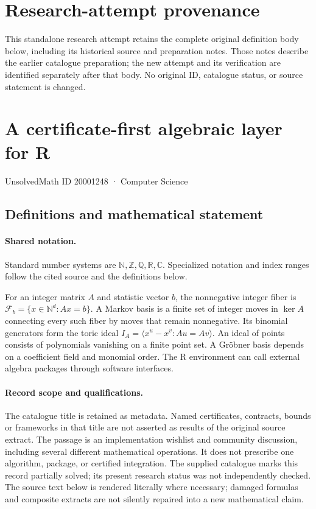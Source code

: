 \documentclass[11pt]{article}
\begin{document}
\section*{Research-attempt provenance}
This standalone research attempt retains the complete original definition body below,
including its historical source and preparation notes. Those notes describe the
earlier catalogue preparation; the new attempt and its verification are identified
separately after that body. No original ID, catalogue status, or source statement is changed.

\section{A certificate-first algebraic layer for R}\label{20001248}
{\small UnsolvedMath ID 20001248 · Computer Science}
\subsection{Definitions and mathematical statement}

\paragraph{Shared notation.}Standard number systems are $\mathbb N,\mathbb Z,\mathbb Q,\mathbb R,\mathbb C$. Specialized notation and index ranges follow the cited source and the definitions below.


For an integer matrix $A$ and statistic vector $b$, the nonnegative integer fiber is $\mathcal F_b=\{x\in\mathbb N^d:Ax=b\}$. A Markov basis is a finite set of integer moves in $\ker A$ connecting every such fiber by moves that remain nonnegative. Its binomial generators form the toric ideal $I_A=\langle x^u-x^v:Au=Av\rangle$. An ideal of points consists of polynomials vanishing on a finite point set. A Gröbner basis depends on a coefficient field and monomial order. The R environment can call external algebra packages through software interfaces.
\paragraph{Record scope and qualifications.}
The catalogue title is retained as metadata. Named certificates, contracts, bounds or frameworks in that title are not asserted as results of the original source extract.
The passage is an implementation wishlist and community discussion, including several different mathematical operations. It does not prescribe one algorithm, package, or certified integration. The supplied catalogue marks this record partially solved; its present research status was not independently checked.
The source text below is rendered literally where necessary; damaged formulas and composite extracts are not silently repaired into a new mathematical claim.
\end{document}
